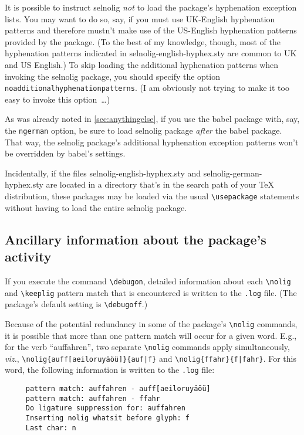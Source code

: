 \documentclass[11pt]{article}
\newcommand{\pkg}[1]{\textsf{#1}}
\newcommand{\opt}[1]{\texttt{#1}}
\newcommand{\cmmd}[1]{\texttt{\textbackslash #1}}
\begin{document}
It is possible to instruct \pkg{selnolig} \emph{not} to load the package's hyphenation exception lists. You may want to do so, say, if you must use UK-English hyphenation patterns and therefore mustn't make use of the US-English hyphenation patterns provided by the package. (To the best of my knowledge, though, most of the hyphenation patterns indicated in \pkg{selnolig-english-hyphex.sty} are common to UK and US English.) To skip loading the additional hyphenation patterns when invoking the \pkg{selnolig} package, you should specify the option \opt{noadditional\-hyphen\-a\-tion\-patterns}. (I am obviously not trying to make it too easy to invoke this option~\dots)

As was already noted in \cref{sec:anythingelse}, if you use the \pkg{babel} package with, say, the \opt{ngerman} option, be sure to load \pkg{selnolig} package \emph{after} the \pkg{babel} package. That way, the \pkg{selnolig} package's additional hyphenation exception patterns won't be overridden by \pkg{babel}'s settings.

Incidentally, if the files \pkg{selnolig-english-hyphex.sty} and \pkg{selnolig-german-hyphex.sty} are located in a directory that's in the search path of your TeX distribution, these packages may be loaded via the usual \cmmd{usepackage} statements without having to load the entire \pkg{selnolig} package.



\subsection{Ancillary information about the package's activity} \label{sec:debugon}

If you execute the command \cmmd{debugon}, detailed information about each \cmmd{nolig} and \cmmd{keeplig} pattern match that is encountered is written to the \opt{.log} file. (The package's default setting is \cmmd{debugoff}.)

Because of the potential redundancy in some of the package's \cmmd{nolig} commands, it is possible that more than one pattern match will occur for a given word. E.g., for the verb \enquote{auffahren}, two separate \cmmd{nolig} commands apply simultaneously, \emph{viz.}, \Verb+\nolig{auff[aeiloruyäöü]}{auf|f}+ and \Verb+\nolig{ffahr}{f|fahr}+. For this word, the following information is written to the \opt{.log} file:
\begin{Verbatim}
     pattern match: auffahren - auff[aeiloruyäöü]
     pattern match: auffahren - ffahr
     Do ligature suppression for: auffahren
     Inserting nolig whatsit before glyph: f
     Last char: n
\end{Verbatim}
\end{document}
